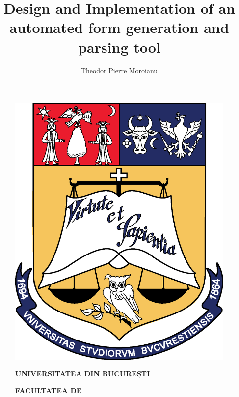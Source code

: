 \documentclass[12pt, a4paper]{report}
\title{Design and Implementation of an automated form generation and parsing tool}
\author{Theodor Pierre Moroianu}
\begin{document}
\cleardoublepage
\pagestyle{front}
\let\ps@plain\ps@front

\begin{titlepage}

  
  \begin{figure}[!htb]
      \centering
      \begin{minipage}{0.2\textwidth}
          \includegraphics[width=\linewidth]{logo-ub.png}
      \end{minipage}
      \begin{minipage}{0.5\textwidth}
          \large
          \vspace{0.2cm}
          \begin{center}
              \textbf{UNIVERSITATEA DIN BUCUREȘTI}
          \end{center}
          \vspace{0.3cm}
          \begin{center}
              \textbf{
                  FACULTATEA DE \\
}
\end{center}
\end{minipage}
\end{figure}
\end{titlepage}
\end{document}
